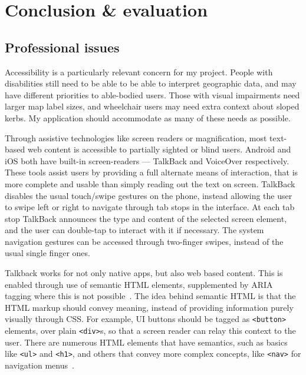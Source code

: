 \documentclass[hyphens]{final_report}
\begin{document}
\clearpage
\chapter{Conclusion \& evaluation}


\section{Professional issues}

Accessibility is a particularly relevant concern for my project. People with disabilities still need to be able to be able to interpret geographic data, and may have different priorities to able-bodied users. Those with visual impairments need larger map label sizes, and wheelchair users may need extra context about sloped kerbs. My application should accommodate as many of these needs as possible.

Through assistive technologies like screen readers or magnification, most text-based web content is accessible to partially sighted or blind users. Android and iOS both have built-in screen-readers --- TalkBack and VoiceOver respectively. These tools assist users by providing a full alternate means of interaction, that is more complete and usable than simply reading out the text on screen. TalkBack disables the usual touch/swipe gestures on the phone, instead allowing the user to swipe left or right to navigate through tab stops in the interface. At each tab stop TalkBack announces the type and content of the selected screen element, and the user can double-tap to interact with it if necessary. The system navigation gestures can be accessed through two-finger swipes, instead of the usual single finger ones.

Talkback works for not only native apps, but also web based content. This is enabled through use of semantic HTML elements, supplemented by ARIA tagging where this is not possible~\cite{w3c-aria}. The idea behind semantic HTML is that the HTML markup should convey meaning, instead of providing information purely visually through CSS\@. For example, UI buttons should be tagged as \texttt{<button>} elements, over plain \texttt{<div>}s, so that a screen reader can relay this context to the user. There are numerous HTML elements that have semantics, such as basics like \texttt{<ul>} and \texttt{<h1>}, and others that convey more complex concepts, like \texttt{<nav>} for navigation menus~\cite{mdn-accessibility-basis}.
\end{document}
